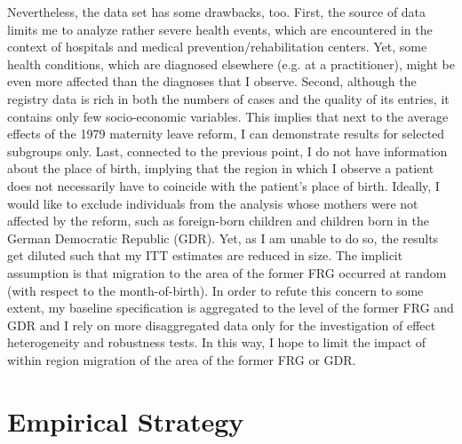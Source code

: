\documentclass[11pt, a4paper]{article} %
\begin{document}
Nevertheless, the data set has some drawbacks, too. First, the source of data limits me to analyze rather severe health events, which are encountered in the context of hospitals and medical prevention/rehabilitation centers. Yet, some health conditions, which are diagnosed elsewhere (e.g. at a practitioner), might be even more affected than the diagnoses that I observe. %
Second, although the registry data is rich in both the numbers of cases and the quality of its entries, it contains only few socio-economic variables. This implies that next to the average effects of the 1979 maternity leave reform, I can demonstrate results for selected subgroups only. Last, connected to the previous point, I do not have information about the place of birth, implying that the region in which I observe a patient does not necessarily have to coincide with the patient's place of birth. Ideally, I would like to exclude individuals from the analysis whose mothers were not affected by the reform, such as foreign-born children and children born in the German Democratic Republic (GDR). Yet, as I am unable to do so, the results get diluted such that my ITT estimates are reduced in size. The implicit assumption is that migration to the area of the former FRG occurred at random (with respect to the month-of-birth). In order to refute this concern to some extent, my baseline specification is aggregated to the level of the former FRG and GDR and I rely on more disaggregated data only for the investigation of effect heterogeneity and robustness tests. In this way, I hope to limit the impact of within region migration of the area of the former FRG or GDR. \newline


















\bigskip
\section{Empirical Strategy}\label{sec:empirical_strategy}
\end{document}

